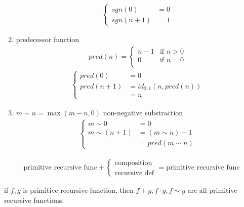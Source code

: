 \begin{enumerate}
\begin{align*}
        \left\{ \begin{array}{rl}
            sgn(0)&=0\\
            sgn(n+1)&=1
        \end{array} \right.
    \end{align*}
    \item predecessor function
    \begin{align*}
        pred(n)=\left\{ \begin{array}{ll}
            n-1 & \text{if }n>0\\
            0 & \text{if }n=0\\
        \end{array} \right.
    \end{align*}
    \begin{align*}
        \left\{ \begin{array}{rl}
            pred(0)&=0\\
            pred(n+1)&=id_{2,1}(n,pred(n))\\
            &=n
        \end{array} \right.
    \end{align*}
    \item $m\sim n=\max(m-n,0)$ non-negative substraction
    \begin{align*}
        \left\{ \begin{array}{rl}
            m\sim 0&=0\\
            m\sim (n+1)&=(m\sim n) -1\\
            &=pred(m\sim n)
        \end{array} \right.
    \end{align*}
\end{enumerate}

\begin{lemma}\scriptsize
    \begin{align*}
        \text{primitive recursive func} + \left\{ \begin{array}{l}
            \text{composition}\\
            \text{recursive def}
        \end{array} \right.=\text{primitive recursive func}
    \end{align*}
\end{lemma}

\begin{corollary}
    if $f,g$ is primitive recursive function, then $f+g, f\cdot g, f\sim g$ are all primitive recursive functions. 
\end{corollary}


